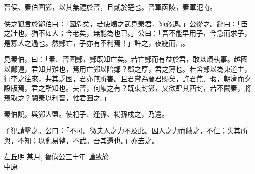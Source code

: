 
\begin{acknowledgement}

晉侯、秦伯圍鄭，以其無禮於晉，且貳於楚也。晉軍函陵，秦軍氾南。

佚之狐言於鄭伯曰：「國危矣，若使燭之武見秦君，師必退。」公從之。辭曰：「臣之壯也，猶不如人；今老矣，無能為也已。」公曰：「吾不能早用子，今急而求子，是寡人之過也。然鄭亡，子亦有不利焉！」許之，夜縋而出。

見秦伯，曰：「秦、晉圍鄭，鄭既知亡矣。若亡鄭而有益於君，敢以煩執事。越國以鄙遠，君知其難也，焉用亡鄭以陪鄰？鄰之厚，君之薄也。若舍鄭以為東道主，行李之往來，共其乏困，君亦無所害。且君嘗為晉君賜矣，許君焦、瑕，朝濟而夕設版焉，君之所知也。夫晉，何厭之有？既東封鄭，又欲肆其西封，若不闕秦，將焉取之？闕秦以利晉，惟君圖之。」

秦伯說，與鄭人盟。使杞子、逢孫、楊孫戍之，乃還。

子犯請擊之。公曰：「不可。微夫人之力不及此。因人之力而敝之，不仁；失其所與，不知；以亂易整，不武。吾其還也。」亦去之。

\begin{flushright}
左丘明 某月, 魯僖公三十年 謹致於\\
中原
\end{flushright}

\end{acknowledgement}